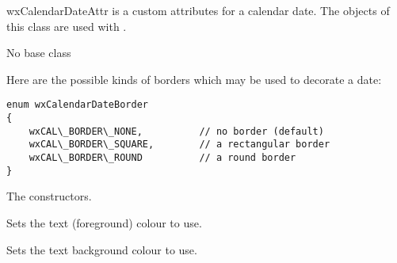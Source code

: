 wxCalendarDateAttr is a custom attributes for a calendar date. The objects of
this class are used with .


No base class

\label{wxcalendardateattrborderkind}

Here are the possible kinds of borders which may be used to decorate a date:

{\small \begin{verbatim}
enum wxCalendarDateBorder
{
    wxCAL\_BORDER\_NONE,          // no border (default)
    wxCAL\_BORDER\_SQUARE,        // a rectangular border
    wxCAL\_BORDER\_ROUND          // a round border
}
\end{verbatim}}




\label{wxcalendardateattrwxcalendardateattr}




The constructors.

\label{wxcalendardateattrsettextcolour}


Sets the text (foreground) colour to use.

\label{wxcalendardateattrsetbackgroundcolour}


Sets the text background colour to use.

\label{wxcalendardateattrsetbordercolour}

